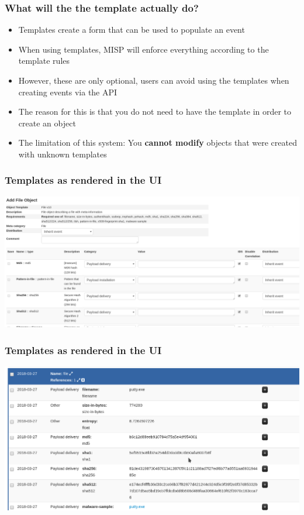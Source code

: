 \begin{frame}
\frametitle{What will the the template actually do?}
\begin{itemize}
\item Templates create a form that can be used to populate an event
\item When using templates, MISP will enforce everything according to the template rules
\item However, these are only optional, users can avoid using the templates when creating events via the API
\item The reason for this is that you do not need to have the template in order to create an object
\item The limitation of this system: You {\bf cannot modify} objects that were created with unknown templates
\end{itemize}
\end{frame}

\begin{frame}
\frametitle{Templates as rendered in the UI}
\includegraphics[scale=0.4]{template.png}
\end{frame}

\begin{frame}
\frametitle{Templates as rendered in the UI}
\includegraphics[scale=0.21]{object.png}
\end{frame}


